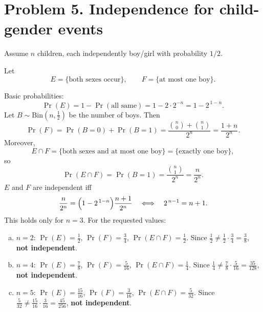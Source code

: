 
\section*{Problem 5. Independence for child-gender events}

Assume $n$ children, each independently boy/girl with probability $1/2$.

Let
\[
E=\{\text{both sexes occur}\},\qquad
F=\{\text{at most one boy}\}.
\]

Basic probabilities:
\[
\Pr(E)=1-\Pr(\text{all same})=1-2\cdot 2^{-n}=1-2^{\,1-n}.
\]
Let $B\sim\mathrm{Bin}(n,\tfrac12)$ be the number of boys. Then
\[
\Pr(F)=\Pr(B=0)+\Pr(B=1)=\frac{\binom{n}{0}+\binom{n}{1}}{2^n}
=\frac{1+n}{2^n}.
\]
Moreover,
\[
E\cap F=\{\text{both sexes and at most one boy}\}=\{\text{exactly one boy}\},
\]
so
\[
\Pr(E\cap F)=\Pr(B=1)=\frac{\binom{n}{1}}{2^n}=\frac{n}{2^n}.
\]
$E$ and $F$ are independent iff
\[
\frac{n}{2^n}=\Bigl(1-2^{\,1-n}\Bigr)\frac{n+1}{2^n}
\quad\Longleftrightarrow\quad
2^{\,n-1}=n+1.
\]
This holds only for $n=3$. For the requested values:

\begin{enumerate}[(a)]
\item $n=2$: $\Pr(E)=\tfrac12$, $\Pr(F)=\tfrac34$, $\Pr(E\cap F)=\tfrac12$.
Since $\tfrac12\ne \tfrac12\cdot\tfrac34=\tfrac38$, \textbf{not independent}.

\item $n=4$: $\Pr(E)=\tfrac78$, $\Pr(F)=\tfrac5{16}$, $\Pr(E\cap F)=\tfrac14$.
Since $\tfrac14\ne \tfrac78\cdot\tfrac5{16}=\tfrac{35}{128}$, \textbf{not independent}.

\item $n=5$: $\Pr(E)=\tfrac{15}{16}$, $\Pr(F)=\tfrac3{16}$, $\Pr(E\cap F)=\tfrac5{32}$.
Since $\tfrac5{32}\ne \tfrac{15}{16}\cdot\tfrac3{16}=\tfrac{45}{256}$, \textbf{not independent}.
\end{enumerate}
